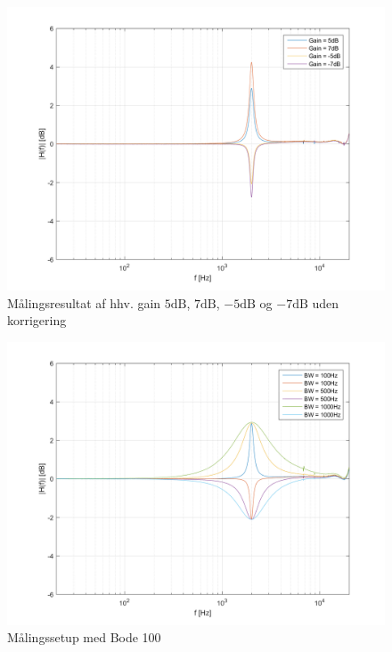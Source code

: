 \begin{figure}[h!]\label{fig:Gain_uden_hotfix}
	\centering
	\includegraphics[scale = 0.8]{billeder/Gain_uden_hotfix}
	\caption{Målingsresultat af hhv. gain $5\si{\dB}$, $7\si{\dB}$, $-5\si{\dB}$ og $-7\si{\dB}$ uden korrigering}
\end{figure}

\begin{figure}[h!]\label{fig:Bandwith_uden_hotfix}
	\centering
	\includegraphics[scale = 0.8]{billeder/Bandwith_uden_hotfix}
	\caption{Målingssetup med Bode 100}
\end{figure}

